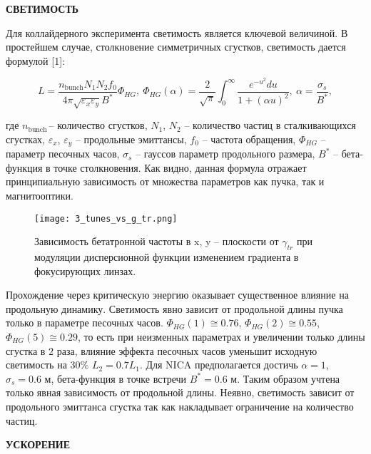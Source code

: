 	\textbf{СВЕТИМОСТЬ}

\par Для коллайдерного эксперимента светимость является ключевой величиной. В простейшем случае, столкновение симметричных сгустков, светимость дается формулой [1]:

\begin{equation}
L=\frac{n_{\mathrm{bunch}}N_1N_2f_0}{4\pi\sqrt{\varepsilon_x\varepsilon_y}B^\ast}\Phi_{HG}, \
\Phi_{HG}(\alpha)=\frac{2}{\sqrt\pi}\int_{0}^{\infty}\frac{e^{-u^2}du}{1+(\alpha u)^2},\
\alpha=\frac{\sigma_s}{B^\ast},
\label{eq:luminocity}
\end{equation}

\noindent где $n_{\mathrm{bunch\ }}$– количество сгустков, $N_1$, $N_2$ – количество частиц в сталкивающихся сгустках, $\varepsilon_x$, $\varepsilon_y$ – продольные эмиттансы, $f_0$ – частота обращения, $\Phi_{HG}$ – параметр песочных часов, $\sigma_s$ – гауссов параметр продольного размера, $B^\ast$ – бета-функция в точке столкновения. Как видно, данная формула отражает принципиальную зависимость от множества параметров как пучка, так и магнитооптики.

\begin{figure}
   \texttt{[image: 3\_tunes\_vs\_g\_tr.png]}
   \caption{Зависимость бетатронной частоты в x, y – плоскости от $\gamma_{tr}$ при модуляции дисперсионной функции изменением градиента в фокусирующих линзах.}
   \label{fig:3_tunes_vs_g_tr.png}
\end{figure}

\par Прохождение через критическую энергию оказывает существенное влияние на продольную динамику. Светимость явно зависит от продольной длины пучка только в параметре песочных часов. $\Phi_{HG}(1)\cong0.76$, $\Phi_{HG}(2)\cong0.55$, $\Phi_{HG}(5)\cong0.29$, то есть при неизменных параметрах и увеличении только длины сгустка в $2$ раза, влияние эффекта песочных часов уменьшит исходную светимость на $30\%$ $L_2=0.7L_1$. Для NICA предполагается достичь $\alpha=1$, $\sigma_s=0.6$ м, бета-функция в точке встречи $B^\ast=0.6$ м. Таким образом учтена только явная зависимость от продольной длины. Неявно, светимость зависит от продольного эмиттанса сгустка так как накладывает ограничение на количество частиц.

	\textbf{УСКОРЕНИЕ}

